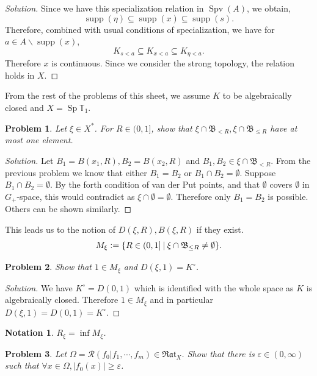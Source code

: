 \documentclass[8pt]{article}
\numberwithin{equation}{section}
\newenvironment{solution}{\begin{proof}[Solution]}{\end{proof}}
\newtheorem{notation}{Notation}[section]
\newtheorem{problem}{Problem}[section]
\DeclareMathOperator{\Sp}{Sp}
\DeclareMathOperator{\supp}{supp}
\DeclareMathOperator{\Spv}{Spv}
\newcommand{\defeq}{\vcentcolon=}
\newcommand{\T}[0]{\mathbb{T}}
\newcommand{\cR}[0]{\mathcal{R}}
\newcommand{\sep}[0]{\:|\:}
\newcommand{\ab}[1]{\vert #1 \vert}
\newcommand{\Rat}[0]{\mathfrak{Rat}}
\begin{document}
\begin{solution}
  Since we have this specialization relation in $\Spv(A)$, we obtain,
  \begin{equation*}
    \supp(\eta)\subseteq\supp(x)\subseteq\supp(s).
  \end{equation*}
  Therefore, combined with usual conditions of specialization, we have for $a\in A\backslash \supp(x)$, 
   \begin{equation*}
    K_{s<a}\subseteq K_{x<a}\subseteq K_{\eta<a}.
  \end{equation*}
  Therefore $x$ is continuous. Since we consider the strong topology, the relation holds in $X$.
\end{solution}
From the rest of the problems of this sheet, we assume $K$ to be algebraically closed and $X=\Sp\T_1$. 
\begin{problem}
  Let $\xi\in X^*$. For $R\in(0,1]$, show that $\xi\cap\mathfrak{B}_{<R},\xi\cap\mathfrak{B}_{\leq R}$ have at most one element.
\end{problem}
\begin{solution}
  Let $B_1=B(x_1,R),B_2 = B(x_2,R)$ and $B_1,B_2\in\xi\cap\mathfrak{B}_{<R}$. From the previous problem we know that either $B_1=B_2$ or $B_1\cap B_2=\emptyset$. Suppose $B_1\cap B_2=\emptyset$. By the forth condition of van der Put points, and that $\emptyset$ covers $\emptyset$ in $G_+$-space, this would contradict as $\xi\cap\emptyset = \emptyset$.
  Therefore only $B_1=B_2$ is possible. Others can be shown similarly.
\end{solution}
This leads us to the notion of $D(\xi,R),B(\xi,R)$ if they exist.
\begin{equation*}
  M_\xi \defeq\{R\in (0,1]\sep \xi\cap\mathfrak{B}_{\leq R}\not=\emptyset\}.
\end{equation*}
\begin{problem}
Show that $1\in M_\xi$ and $D(\xi,1)=K^\circ$.
\end{problem}
\begin{solution}
  We have $K^\circ = D(0,1)$ which is identified with the whole space as $K$ is algebraically closed. Therefore $1\in M_\xi$ and in particular $D(\xi,1) = D(0,1) = K^\circ$.
\end{solution}
\begin{notation}
  $R_\xi = \inf M_\xi$.
\end{notation}
\begin{problem}
  Let $\Omega = \cR(f_0|f_1,\cdots,f_m)\in\Rat_X$. Show that there is $\varepsilon\in(0,\infty)$ such that $\forall x\in \Omega, \ab{f_0(x)}\geq\varepsilon$.
\end{problem}
\end{document}
